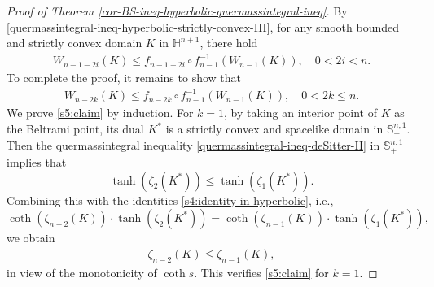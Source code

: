 \documentclass[11pt,reqno]{amsart}
\theoremstyle{definition}
\theoremstyle{remark}
\numberwithin{equation}{section}
\renewcommand{\(}{\left(}
\renewcommand{\)}{\right)}
\renewcommand{\~}{\tilde}
\renewcommand{\-}{\overline}
\begin{document}
\begin{proof}[Proof of Theorem \ref{cor-BS-ineq-hyperbolic-quermassintegral-ineq}]
    By \eqref{quermassintegral-ineq-hyperbolic-strictly-convex-III}, for any smooth bounded and strictly convex domain $K$ in $\mathbb H^{n+1}$, there hold
    \begin{align*}
    W_{n-1-2i}(K) \leq f_{n-1-2i}\circ f^{-1}_{n-1}(W_{n-1}(K)), \quad 0<2i<n.
    \end{align*}
    To complete the proof, it remains to show that 
    \begin{align}\label{s5:claim}
    W_{n-2k}(K) \leq f_{n-2k}\circ f^{-1}_{n-1}(W_{n-1}(K)), \quad 0<2k\leq n.
    \end{align}
    We prove \eqref{s5:claim} by induction. For $k=1$, by taking an interior point of $K$ as the Beltrami point, its dual $K^\ast$ is a strictly convex and spacelike domain in $\mathbb S^{n,1}_{+}$. Then the quermassintegral inequality \eqref{quermassintegral-ineq-deSitter-II} in $\mathbb S_{+}^{n,1}$ implies that
    $$
    \tanh(\zeta_{2}(K^\ast)) \leq \tanh(\zeta_{1}(K^\ast)).
    $$
    Combining this with the identities \eqref{s4:identity-in-hyperbolic}, i.e.,
    $$
    \coth(\zeta_{n-2}(K)) \cdot \tanh(\zeta_{2}(K^\ast))=\coth(\zeta_{n-1}(K)) \cdot \tanh(\zeta_{1}(K^\ast)),
    $$
    we obtain
    \begin{align*}
    \zeta_{n-2}(K) \leq \zeta_{n-1}(K),
    \end{align*}
    in view of the monotonicity of $\coth s$. This verifies \eqref{s5:claim} for $k=1$.
    

\end{proof}
\end{document}
